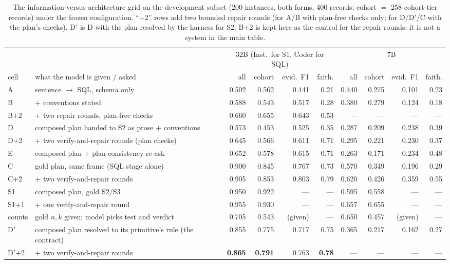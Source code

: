 \begin{table}[t]
\centering
\small
\setlength{\tabcolsep}{4pt}
\begin{tabular}{llrrrrrrrr}
\toprule
 & & \multicolumn{4}{c}{32B (Inst.\ for S1, Coder for SQL)} & \multicolumn{4}{c}{7B} \\
cell & what the model is given / asked & all & cohort & evid.\ F1 & faith. & all & cohort & evid.\ F1 & faith. \\
\midrule
A & sentence $\rightarrow$ SQL, schema only & 0.502 & 0.562 & 0.441 & 0.21 & 0.440 & 0.275 & 0.101 & 0.23 \\
B & \quad + conventions stated & 0.588 & 0.543 & 0.517 & 0.28 & 0.380 & 0.279 & 0.124 & 0.18 \\
B$+$2 & \quad + two repair rounds, plan-free checks & 0.660 & 0.655 & 0.643 & 0.53 & --- & --- & --- & --- \\
\midrule
D & composed plan handed to S2 as prose $+$ conventions & 0.573 & 0.453 & 0.525 & 0.35 & 0.287 & 0.209 & 0.238 & 0.39 \\
D$+$2 & \quad + two verify-and-repair rounds (plan checks) & 0.645 & 0.566 & 0.611 & 0.71 & 0.295 & 0.221 & 0.230 & 0.37 \\
E & composed plan $+$ plan-consistency re-ask & 0.652 & 0.578 & 0.615 & 0.71 & 0.263 & 0.171 & 0.234 & 0.48 \\
\midrule
C & gold plan, same frame (SQL stage alone) & 0.900 & 0.845 & 0.767 & 0.73 & 0.570 & 0.349 & 0.196 & 0.29 \\
C$+$2 & \quad + two verify-and-repair rounds & 0.905 & 0.853 & 0.803 & 0.79 & 0.620 & 0.426 & 0.359 & 0.55 \\
S1 & composed plan, gold S2/S3 & 0.950 & 0.922 & --- & --- & 0.595 & 0.558 & --- & --- \\
S1$+$1 & \quad + one verify-and-repair round & 0.955 & 0.930 & --- & --- & 0.657 & 0.655 & --- & --- \\
counts & gold $n,k$ given; model picks test and verdict & 0.705 & 0.543 & (given) & --- & 0.650 & 0.457 & (given) & --- \\
\midrule
D$'$ & composed plan resolved to its primitive's rule (the contract) & 0.855 & 0.775 & 0.717 & 0.75 & 0.365 & 0.217 & 0.162 & 0.27 \\
D$'$$+$2 & \quad + two verify-and-repair rounds & \textbf{0.865} & \textbf{0.791} & 0.763 & \textbf{0.78} & --- & --- & --- & --- \\
\bottomrule
\end{tabular}
\caption{The information-versus-architecture grid on the development subset
(200 instances, both forms, 400 records; cohort $=$ 258 cohort-tier records)
under the frozen configuration. ``$+$2'' rows add two bounded repair rounds
(for A/B with plan-free checks only; for D/D$'$/C with the plan's checks).
D$'$ is D with the plan resolved by the harness for S2. B$+$2 is kept here as
the control for the repair rounds; it is not a system in the main table.}
\label{tab:grid}
\end{table}
\fi

